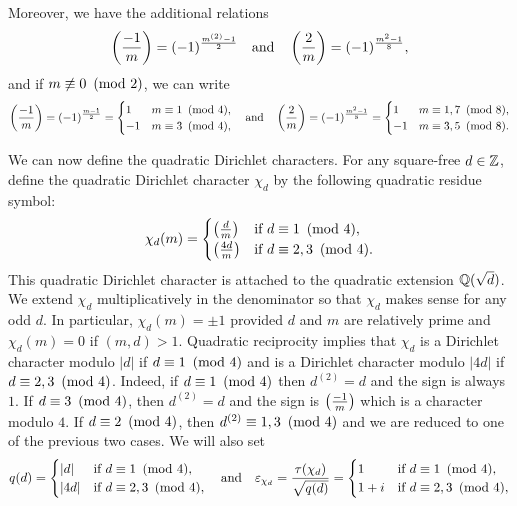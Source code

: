 \documentclass[12pt,reqno,oneside]{amsart}
\begin{document}
    Moreover, we have the additional relations
    \[
        \left(\frac{-1}{m}\right) = (-1)^{\frac{m^{(2)}-1}{2}} \quad \text{and} \quad \left(\frac{2}{m}\right) = (-1)^{\frac{m^{2}-1}{8}},
    \]
    and if $m \not\equiv 0 \ \left(\text{mod }2\right)$, we can write
    \[
        \left(\frac{-1}{m}\right) = (-1)^{\frac{m-1}{2}} = \begin{cases} 1 & \text{$m \equiv 1 \ \left(\text{mod }4\right)$}, \\ -1 & \text{$m \equiv 3 \ \left(\text{mod }4\right)$}, \end{cases} \quad \text{and} \quad \left(\frac{2}{m}\right) = (-1)^{\frac{m^{2}-1}{8}} = \begin{cases} 1 & \text{$m \equiv 1,7 \ \left(\text{mod }8\right)$}, \\ -1 & \text{$m \equiv 3,5 \ \left(\text{mod }8\right)$}. \end{cases}
    \]

    We can now define the quadratic Dirichlet characters. For any square-free $d \in \mathbb{Z}$, define the quadratic Dirichlet character $\chi_{d}$ by the following quadratic residue symbol:
    \[
        \chi_{d}(m) = \begin{cases} \left(\frac{d}{m}\right) & \text{if $d \equiv 1 \ \left(\text{mod }4\right)$}, \\ \left(\frac{4d}{m}\right) & \text{if $d \equiv 2,3 \ \left(\text{mod }4\right)$}. \end{cases}
    \]
    This quadratic Dirichlet character is attached to the quadratic extension $\mathbb{Q}(\sqrt{d})$. We extend $\chi_{d}$ multiplicatively in the denominator so that $\chi_{d}$ makes sense for any odd $d$. In particular, $\chi_{d}(m) = \pm1$ provided $d$ and $m$ are relatively prime and $\chi_{d}(m) = 0$ if $(m,d) > 1$. Quadratic reciprocity implies that $\chi_{d}$ is a Dirichlet character modulo $|d|$ if $d \equiv 1 \ \left(\text{mod }4\right)$ and is a Dirichlet character modulo $|4d|$ if $d \equiv 2,3 \ \left(\text{mod }4\right)$. Indeed, if $d \equiv 1 \ \left(\text{mod }4\right)$ then $d^{(2)} = d$ and the sign is always $1$. If $d \equiv 3 \ \left(\text{mod }4\right)$, then $d^{(2)} = d$ and the sign is $\textstyle{\left(\frac{-1}{m}\right)}$ which is a character modulo $4$. If $d \equiv 2 \ \left(\text{mod }4\right)$, then $d^{(2)} \equiv 1,3 \ \left(\text{mod }4\right)$ and we are reduced to one of the previous two cases. We will also set
    \[
        q(d) = \begin{cases} |d| & \text{if $d \equiv 1 \ \left(\text{mod }4\right)$}, \\ |4d| & \text{if $d \equiv 2,3 \ \left(\text{mod }4\right)$}, \end{cases} \quad \text{and} \quad \varepsilon_{\chi_{d}} = \frac{\tau(\chi_{d})}{\sqrt{q(d)}} = \begin{cases} 1 & \text{if $d \equiv 1 \ \left(\text{mod }4\right)$}, \\ 1+i & \text{if $d \equiv 2,3 \ \left(\text{mod }4\right)$}, \end{cases}
    \]
\end{document}
